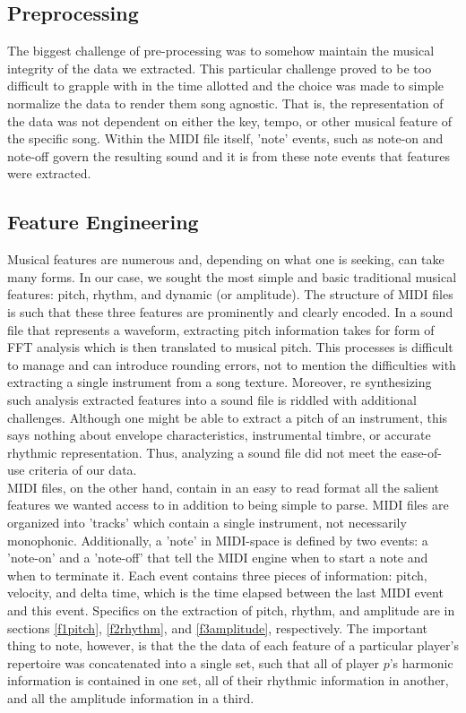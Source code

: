 \documentclass[conference]{IEEEtran}
\begin{document}
\subsection{Preprocessing} \label{Preprocessing}
The biggest challenge of pre-processing was to somehow maintain the musical integrity of the data we extracted. This particular challenge proved to be too difficult to grapple with in the time allotted and the choice was made to simple normalize the data to render them song agnostic. That is, the representation of the data was not dependent on either the key, tempo, or other musical feature of the specific song. Within the MIDI file itself, 'note' events, such as note-on and note-off govern the resulting sound and it is from these note events that features were extracted.\\

\subsection{Feature Engineering} \label{Feature Engineering}
Musical features are numerous and, depending on what one is seeking, can take many forms. In our case, we sought the most simple and basic traditional musical features: pitch, rhythm, and dynamic (or amplitude). The structure of MIDI files is such that these three features are prominently and clearly encoded. In a sound file that represents a waveform, extracting pitch information takes for form of FFT analysis which is then translated to musical pitch. This processes is difficult to manage and can introduce rounding errors, not to mention the difficulties with extracting a single instrument from a song texture. Moreover, re synthesizing such analysis extracted features into a sound file is riddled with additional challenges. Although one might be able to extract a pitch of an instrument, this says nothing about envelope characteristics, instrumental timbre, or accurate rhythmic representation. Thus, analyzing a sound file did not meet the ease-of-use criteria of our data.\\

MIDI files, on the other hand, contain in an easy to read format all the salient features we wanted access to in addition to being simple to parse. MIDI files are organized into 'tracks' which contain a single instrument, not necessarily monophonic. Additionally, a 'note' in MIDI-space is defined by two events: a 'note-on' and a 'note-off' that tell the MIDI engine when to start a note and when to terminate it. Each event contains three pieces of information: pitch, velocity, and delta time, which is the time elapsed between the last MIDI event and this event. Specifics on the extraction of pitch, rhythm, and amplitude are in sections \ref{f1pitch}, \ref{f2rhythm}, and \ref{f3amplitude}, respectively. The important thing to note, however, is that the the data of each feature of a particular player's repertoire was concatenated into a single set, such that all of player $p$'s harmonic information is contained in one set, all of their rhythmic information in another, and all the amplitude information in a third.\\
\end{document}
